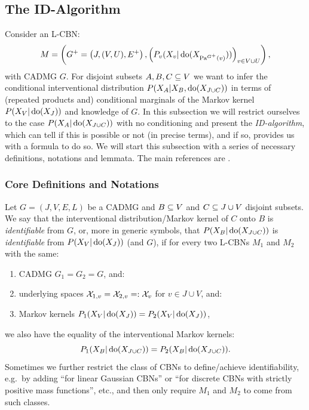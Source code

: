 
\subsection{The ID-Algorithm}

        Consider an L-CBN:
            \[M= \left ( G^+=\left ( J,(V,U),E^+ \right ), \left ( P_v ( X_v|\operatorname{do}( X_{\mathrm{Pa}^{G^+}(v)})) \right )_{v \in V \cup U} \right ),\]
        with \observational CADMG $G$.
        For disjoint subsets $A,B,C \subseteq V$ we want to infer the conditional interventional distribution $P(X_A|X_B,\operatorname{do}(X_{J \cup C}))$ 
        in terms of (repeated products and) conditional marginals of the \observational Markov kernel $P(X_V|\operatorname{do}(X_J))$ 
        and knowledge of $G$. 
        In this subsection we will restrict ourselves to the case $P(X_A|\operatorname{do}(X_{J \cup C}))$ with no conditioning and 
        present the \emph{ID-algorithm}, which can tell if this is possible or not (in precise terms), 
        and if so, provides us with a formula to do so. 
        We will start this subsection with a series of necessary definitions, notations and lemmata.
        The main references are \cite{Pearl09,GP95s,Tian2002,TP02s,Tian04s,SP06,HV06s,HV08s,RERS17,FM20}.

\subsubsection{Core Definitions and Notations}

\begin{Def} 
    \label{def:id-causal-effect}
    Let $G=(J,V,E,L)$ be a CADMG and $B \subseteq V$ and $C \subseteq J \cup V$ disjoint subsets.
    We say that the interventional distribution/Markov kernel of $C$ onto $B$ is \emph{identifiable} from $G$,
    or, more in generic symbols, that $P(X_B|\operatorname{do}(X_{J \cup C}))$ is \emph{identifiable} from $P(X_V|\operatorname{do}(X_J))$ (and $G$),
    if for every two L-CBNs $M_1$ and $M_2$ with the same:
    \begin{enumerate}
        \item \observational CADMG $G_1=G_2=G$, and: 
        \item underlying spaces $\mathcal{X}_{1,v}=\mathcal{X}_{2,v}=:\mathcal{X}_v$ for $v \in J \cup V$, and:
        \item \observational Markov kernels $P_1(X_V|\operatorname{do}(X_J)) =P_2(X_V|\operatorname{do}(X_J))$,
    \end{enumerate}
    we also have the equality of the interventional Markov kernels:
    \[ P_1(X_B|\operatorname{do}(X_{J \cup C})) = P_2(X_B|\operatorname{do}(X_{J \cup C})). \]
    Sometimes we further restrict the class of CBNs to define/achieve identifiability, e.g.\ by adding
    ``for linear Gaussian CBNs'' or ``for discrete CBNs with strictly positive mass functions'', etc., and then only require $M_1$ and $M_2$ 
    to come from such classes.
\end{Def}

